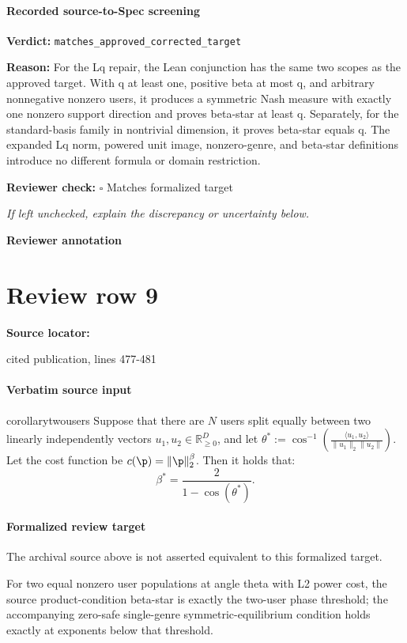 \documentclass[10pt]{article}
\newcommand{\reviewerbox}{%
  \par\noindent\fbox{\parbox{0.96\linewidth}{\rule{0pt}{0.38in}}}\par
}
\newcommand{\reviewmatch}[1]{%
  \par\noindent\textbf{Reviewer check:} $\square$\; #1\par
  \noindent\emph{If left unchecked, explain the discrepancy or uncertainty below.}\par
}
\begin{document}
\paragraph{Recorded source-to-Spec screening}
\textbf{Verdict:} \texttt{matches\_approved\_corrected\_target}
\\
{\raggedright
\textbf{Reason:} For the Lq repair, the Lean conjunction has the same two scopes as the approved target.\allowbreak{} With q at least one, positive beta at most q, and arbitrary nonnegative nonzero users, it produces a symmetric Nash measure with exactly one nonzero support direction and proves beta-\allowbreak{}star at least q.\allowbreak{} Separately, for the standard-\allowbreak{}basis family in nontrivial dimension, it proves beta-\allowbreak{}star equals q.\allowbreak{} The expanded Lq norm, powered unit image, nonzero-\allowbreak{}genre, and beta-\allowbreak{}star definitions introduce no different formula or domain restriction.\allowbreak{}
\par}
\reviewmatch{Matches formalized target}
\noindent\textbf{Reviewer annotation}\par
\reviewerbox
\clearpage
\hypertarget{source-claim-21cc7378ab024b6b}{}
\section*{Review row 9}
\textbf{Source locator:} {\footnotesize\raggedright cited publication, lines 477-\allowbreak{}481\par}
\paragraph{Verbatim source input}
\begin{ReviewVerbatim}
\begin{restatable}{corollary}{twousers}
\label{cor:2users}
Suppose that there are $N$ users split equally between two linearly independently vectors $u_1, u_2 \in \mathbb{R}_{\ge 0}^D$, and let $\theta^* := \cos^{-1}\left( \frac{\langle u_1, u_2\rangle}{\|u_1\|_2 \|u_2\|} \right)$. Let the cost function be $c(\p) = \|\p\|_{2}^{\beta}$. Then it holds that:
\[\beta^*  = \frac{2}{1 - \cos(\theta^*)}. \]
\end{restatable}
\end{ReviewVerbatim}


\paragraph{Formalized review target}
The archival source above is not asserted equivalent to this formalized target.
\begin{ReviewVerbatim}
For two equal nonzero user populations at angle theta with L2 power cost, the source product-condition beta-star is exactly the two-user phase threshold; the accompanying zero-safe single-genre symmetric-equilibrium condition holds exactly at exponents below that threshold.
\end{ReviewVerbatim}
\end{document}
